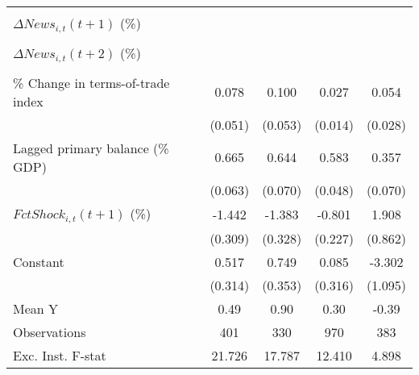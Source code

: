 {\begin{tabular}{l*{4}{c}}
                    &                     &                     &                     &                     \\
\addlinespace
$ \Delta News_{i,t}(t+1)$ (\%)&                     &                     &                     &                     \\
                    &                     &                     &                     &                     \\
\addlinespace
$ \Delta News_{i,t}(t+2)$ (\%)&                     &                     &                     &                     \\
                    &                     &                     &                     &                     \\
\addlinespace
\% Change in terms-of-trade index&       0.078         &       0.100\sym{*}  &       0.027\sym{*}  &       0.054\sym{*}  \\
                    &     (0.051)         &     (0.053)         &     (0.014)         &     (0.028)         \\
\addlinespace
Lagged primary balance (\% GDP)&       0.665\sym{***}&       0.644\sym{***}&       0.583\sym{***}&       0.357\sym{***}\\
                    &     (0.063)         &     (0.070)         &     (0.048)         &     (0.070)         \\
\addlinespace
$ FctShock_{i,t}(t+1)$ (\%)&      -1.442\sym{***}&      -1.383\sym{***}&      -0.801\sym{***}&       1.908\sym{**} \\
                    &     (0.309)         &     (0.328)         &     (0.227)         &     (0.862)         \\
\addlinespace
Constant            &       0.517         &       0.749\sym{**} &       0.085         &      -3.302\sym{***}\\
                    &     (0.314)         &     (0.353)         &     (0.316)         &     (1.095)         \\
\midrule
Mean Y              &        0.49         &        0.90         &        0.30         &       -0.39         \\
Observations        &         401         &         330         &         970         &         383         \\
Exc. Inst. F-stat   &      21.726         &      17.787         &      12.410         &       4.898         \\
\bottomrule
\end{tabular}
}
